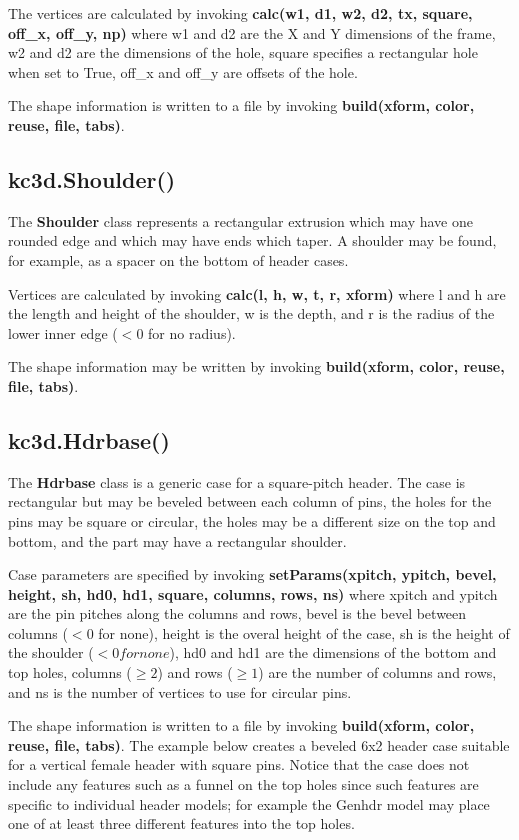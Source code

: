 \documentclass[a4paper, dvipdfm]{article}
\begin{document}
The vertices are calculated by invoking \textbf{calc(w1, d1, w2, d2, tx, square, off\_x, off\_y, np)}
where w1 and d2 are the X and Y dimensions of the frame, w2 and d2 are the dimensions of the
hole, square specifies a rectangular hole when set to True, off\_x and off\_y are offsets of
the hole.

The shape information is written to a file by invoking \textbf{build(xform, color, reuse, file, tabs)}.

\subsection{kc3d.Shoulder()}
The \textbf{Shoulder} class represents a rectangular extrusion which may have one rounded edge
and which may have ends which taper. A shoulder may be found, for example, as a spacer on the
bottom of header cases.

Vertices are calculated by invoking \textbf{calc(l, h, w, t, r, xform)} where l and h are the length
and height of the shoulder, w is the depth, and r is the radius of the lower inner edge ($<0$ for no radius).

The shape information may be written by invoking \textbf{build(xform, color, reuse, file, tabs)}.

\subsection{kc3d.Hdrbase()}
The \textbf{Hdrbase} class is a generic case for a square-pitch header. The case is rectangular but
may be beveled between each column of pins, the holes for the pins may be square or circular, the
holes may be a different size on the top and bottom, and the part may have a rectangular shoulder.

Case parameters are specified by invoking \textbf{setParams(xpitch, ypitch, bevel, height, sh, hd0,
hd1, square, columns, rows, ns)} where xpitch and ypitch are the pin pitches along the columns and
rows, bevel is the bevel between columns ($<0$ for none), height is the overal height of the case,
sh is the height of the shoulder ($<0 for none$), hd0 and hd1 are the dimensions of the bottom and
top holes, columns ($\ge2$) and rows ($\ge1$) are the number of columns and rows, and ns is the number
of vertices to use for circular pins.

The shape information is written to a file by invoking \textbf{build(xform, color, reuse, file, tabs)}.
The example below creates a beveled 6x2 header case suitable for a vertical female header with square pins.
Notice that the case does not include any features such as a funnel on the top holes since such features
are specific to individual header models; for example the Genhdr model may place one of at least three
different features into the top holes.
\end{document}
